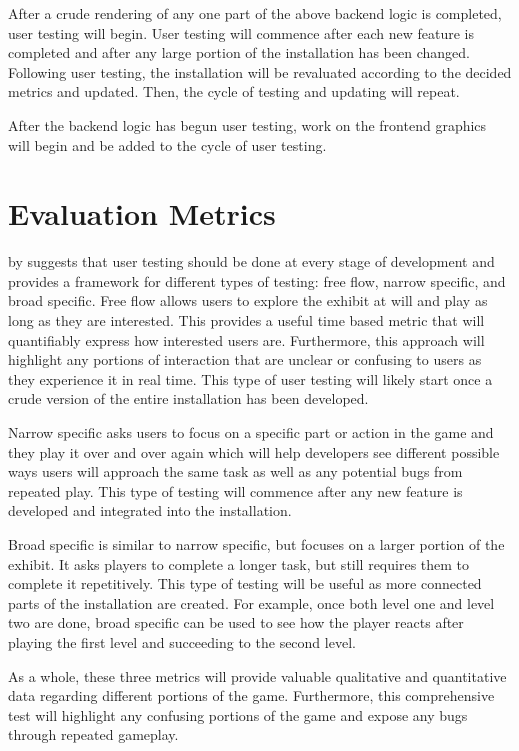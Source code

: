 \documentclass[10pt,twocolumn]{article}
\begin{document}
After a crude rendering of any one part of the above backend logic is completed, user testing will begin. User testing will commence after each new feature is completed and after any large portion of the installation has been changed. Following user testing, the installation will be revaluated according to the decided metrics and updated. Then, the cycle of testing and updating will repeat. 

After the backend logic has begun user testing, work on the frontend graphics will begin and be added to the cycle of user testing. 

\section{Evaluation Metrics}
 by \citeauthor{bernhaupt_video_2010} suggests that user testing should be done at every stage of development and provides a framework for different types of testing: free flow, narrow specific, and broad specific. Free flow allows users to explore the exhibit at will and play as long as they are interested.  This provides a useful time based metric that will quantifiably express how interested users are.  Furthermore, this approach will highlight any portions of interaction that are unclear or confusing to users as they experience it in real time. This type of user testing will likely start once a crude version of the entire installation has been developed. 

Narrow specific asks users to focus on a specific part or action in the game and they play it over and over again which will help developers see different possible ways users will approach the same task as well as any potential bugs from repeated play. This type of testing will commence after any new feature is developed and integrated into the installation. 

Broad specific is similar to narrow specific, but focuses on a larger portion of the exhibit.  It asks players to complete a longer task, but still requires them to complete it repetitively. This type of testing will be useful as more connected parts of the installation are created. For example, once both level one and level two are done, broad specific can be used to see how the player reacts after playing the first level and succeeding to the second level. 

As a whole, these three metrics will provide valuable qualitative and quantitative data regarding different portions of the game. Furthermore, this comprehensive test will highlight any confusing portions of the game and expose any bugs through repeated gameplay. 
\end{document}
